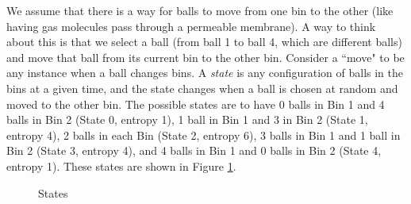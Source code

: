 We assume that there is a way for balls to move from one bin to the other (like having gas molecules pass through a permeable membrane). A way to think about this is that we select a ball (from ball 1 to ball 4, which are different balls) and move that ball from its current bin to the other bin. Consider a ``move" to be any instance when a ball changes bins. A \emph{state} is any configuration of balls in the bins at a given time, and the state changes when a ball is chosen at random and moved to the other bin. The possible states are to have 0 balls in Bin 1 and 4 balls in Bin 2 (State 0, entropy 1), 1 ball in Bin 1 and 3 in Bin 2 (State 1, entropy 4), 2 balls in each Bin (State 2, entropy 6), 3 balls in Bin 1 and 1 ball in Bin 2 (State 3, entropy 4), and 4 balls in Bin 1 and 0 balls in Bin 2 (State 4, entropy 1). These states are shown in Figure \ref{F:Ehrenfest}.

\begin{figure}[h]
\begin{center}
\end{center}
\caption{States}
\label{F:Ehrenfest}
\end{figure}



